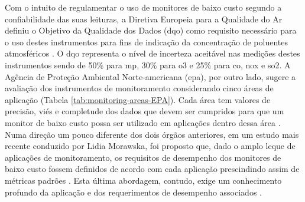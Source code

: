 Com o intuito de regulamentar o uso de monitores de baixo custo segundo a confiabilidade das suas leituras, a Diretiva Europeia para a Qualidade do Ar definiu o Objetivo da Qualidade dos Dados (\gls{dqo}) como requisito necessário para o uso destes instrumentos para fins de indicação da concentração de poluentes atmosféricos \cite{EU2008DirectiveEurope}. O \gls{dqo} representa o nível de incerteza aceitável nas medições destes instrumentos sendo de 50\% para \acrshort{mp}, 30\% para \acrshort{o3} e 25\% para \acrshort{co}, \acrshort{nox} e \acrshort{so2}. A Agência de Proteção Ambiental Norte-americana (\gls{epa}), por outro lado, sugere a avaliação dos instrumentos de monitoramento considerando cinco áreas de aplicação (Tabela \ref{tab:monitoring-areas-EPA}). Cada área tem valores de precisão, viés e completude dos dados que devem ser cumpridos para que um monitor de baixo custo possa ser utilizado em aplicações dentro dessa área \cite{Williams2014AirGuidebook}. Numa direção um pouco diferente dos dois órgãos anteriores, em um estudo mais recente conduzido por Lidia Morawska, foi proposto que, dado o amplo leque de aplicações de monitoramento, os requisitos de desempenho dos monitores de baixo custo fossem definidos de acordo com cada aplicação prescindindo assim de métricas padrões \cite{Morawska2018ApplicationsGone}. Esta última abordagem, contudo, exige um conhecimento profundo da aplicação e dos requerimentos de desempenho associados \cite{Morawska2018ApplicationsGone}.


